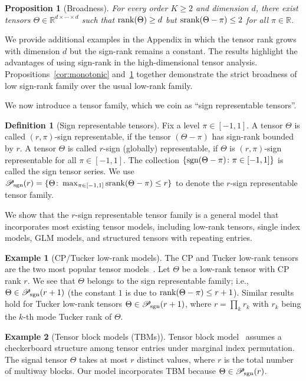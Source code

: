 \documentclass{article}
\theoremstyle{plain}
\newtheorem{prop}{Proposition}
\theoremstyle{definition}
\newtheorem{defn}{Definition}
\newtheorem{example}{Example}
\def\sign{\textup{sgn}}
\def\srank{\textup{srank}}
\def\rank{\textup{rank}}
\def\caliP{\mathscr{P}_{\textup{sgn}}}
\begin{document}
\begin{prop}[Broadness]\label{prop:extention}\label{cor:broadness}For every order $K\geq 2$ and dimension $d$, there exist tensors $\Theta\in\mathbb{R}^{d\times \cdots \times d}$ such that $\rank(\Theta)\geq d$ but $\srank(\Theta-\pi)\leq 2$ for all $\pi\in\mathbb{R}$.  
\end{prop}
We provide additional examples in the Appendix in which the tensor rank grows with dimension $d$ but the sign-rank remains a constant. The results highlight the advantages of using sign-rank in the high-dimensional tensor analysis.  Propositions~\ref{cor:monotonic} and~\ref{prop:extention} together demonstrate the strict broadness of low sign-rank family over the usual low-rank family. 

We now introduce a tensor family, which we coin as ``sign representable tensors''.
\begin{defn}[Sign representable tensors] 
Fix a level $\pi\in[-1,1]$. A tensor $\Theta$ is called $(r,\pi)$-sign representable, if the tensor $(\Theta-\pi)$ has sign-rank bounded by $r$. A tensor $\Theta$ is called $r$-sign (globally) representable, if $\Theta$ is $(r,\pi)$-sign representable for all $\pi\in[-1,1]$. The collection $\{\sign(\Theta-\pi)\colon \pi \in[-1,1]\}$ is called the sign tensor series. 
We use $\caliP(r)=\{\Theta\colon \max_{\pi\in[-1,1]}\srank(\Theta-\pi)\leq r\}$ to denote the $r$-sign representable tensor family.
\end{defn}

We show that the $r$-sign representable tensor family is a general model that incorporates most existing tensor models, including low-rank tensors, single index models, GLM models, and structured tensors with repeating entries. 

\begin{example}[CP/Tucker low-rank models] The CP and Tucker low-rank tensors are the two most popular tensor models~\citep{kolda2009tensor}. Let $\Theta$ be a low-rank tensor with CP rank $r$. We see that $\Theta$ belongs to the sign representable family; i.e., $\Theta\in\caliP(r+1)$ (the constant $1$ is due to $\rank(\Theta-\pi)\leq r+1$). Similar results hold for Tucker low-rank tensors $\Theta\in\caliP(r+1)$, where $r=\prod_kr_k$ with $r_k$ being the $k$-th mode Tucker rank of $\Theta$.  
\end{example} 

\begin{example}[Tensor block models (TBMs)] Tensor block model~\citep{wang2019multiway,chi2020provable} assumes a checkerboard structure among tensor entries under marginal index permutation. The signal tensor $\Theta$ takes at most $r$ distinct values, where $r$ is the total number of multiway blocks. Our model incorporates TBM because $\Theta \in \caliP(r)$. 
\end{example}
\end{document}
